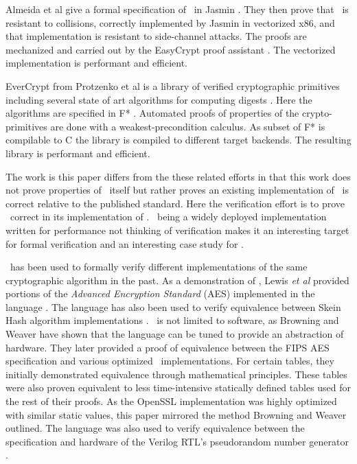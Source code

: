 Almeida et al give a formal specification of \shaThree\ in Jasmin \cite{10.1145/3319535.3363211}.
They then prove that \shaThree\ is resistant to collisions, correctly implemented by Jasmin in vectorized x86, and that implementation is resistant to side-channel attacks.
The proofs are mechanized and carried out by the EasyCrypt proof assistant \cite{easycrypt}.
The vectorized implementation is performant and efficient.

EverCrypt from Protzenko et al is a library of verified cryptographic primitives including several state of art algorithms for computing digests \cite{9152808}.
Here the algorithms are specified in F* \cite{fstar}.
Automated proofs of properties of the crypto-primitives are done with a weakest-precondition calculus.
As subset of F* is compilable to C the library is compiled to different target backends.
The resulting library is performant and efficient.

The work is this paper differs from the these related efforts in that this work does not prove properties of \shaThree\ itself but rather proves an existing implementation of \shaThree\ is correct relative to the published standard.
Here the verification effort is to prove \openssl\ correct in its implementation of \shaThree.
\openssl\ being a widely deployed implementation written for performance not thinking of verification makes it an interesting target for formal verification and an interesting case study for \saw.

\cryptol\ has been used to formally verify different implementations of the same cryptographic algorithm in the past.
As a demonstration of \cryptol, Lewis \emph{et al} provided portions of the \emph{Advanced Encryption Standard} (AES) implemented in the language \cite{crypt-hi}.
The language has also been used to verify equivalence between Skein Hash algorithm implementations \cite{hard-soft}.
\cryptol\ is not limited to software, as Browning and Weaver \cite{design-verif} have shown that the language can be tuned to provide an abstraction of hardware.
They later provided a proof of equivalence between the FIPS AES specification and various optimized \cryptol\ implementations.
For certain tables, they initially demonstrated equivalence through mathematical principles.
These tables were also proven equivalent to less time-intensive statically defined tables used for the rest of their proofs.
As the OpenSSL implementation was highly optimized with similar static values, this paper mirrored the method Browning and Weaver outlined.
The language was also used to verify equivalence between the specification and hardware of the Verilog RTL's pseudorandom number generator \cite{pseudorandom}.

